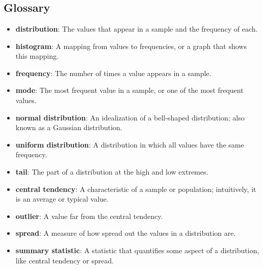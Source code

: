 \chapter{ }  \section*{Glossary} \begin{itemize}
	
	\item {\bf distribution}: The values that appear in a sample
	and the frequency of each.
	
	\item {\bf histogram}: A mapping from values to frequencies, or a graph
	that shows this mapping.
	
	\item {\bf frequency}: The number of times a value appears in a sample.
	
	\item {\bf mode}: The most frequent value in a sample, or one of the
	most frequent values.
	
	\item {\bf normal distribution}: An idealization of a bell-shaped distribution;
	also known as a Gaussian distribution. 
	
	\item {\bf uniform distribution}: A distribution in which all values have
	the same frequency.
	
	\item {\bf tail}: The part of a distribution at the high and low extremes.
	
	\item {\bf central tendency}: A characteristic of a sample or population;
	intuitively, it is an average or typical value. 
	
	\item {\bf outlier}: A value far from the central tendency.
	
	\item {\bf spread}: A measure of how spread out the values in a distribution
	are.
	
	\item {\bf summary statistic}: A statistic that quantifies some aspect
	of a distribution, like central tendency or spread.
	

\end{itemize}
